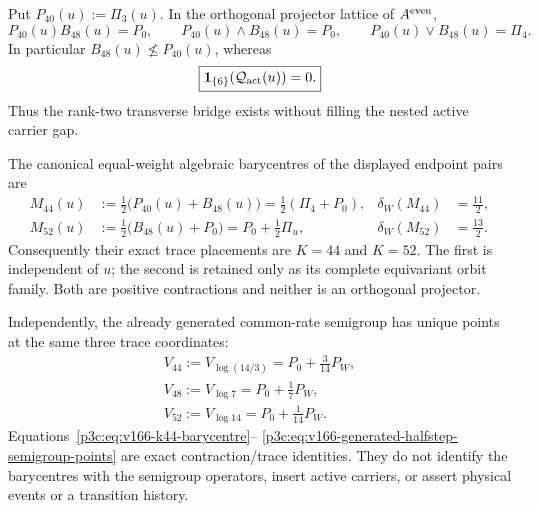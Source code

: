 \documentclass[12pt,a4paper]{article}
\begin{document}
\begin{theorem}
\label{p3c:thm:v166-transverse-diamond-halfsteps}
Put \(P_{40}(u):=\Pi_3(u)\).  In the orthogonal projector lattice of
\(A^{\rm even}\),
\begin{equation}
 \label{p3c:eq:v166-transverse-projector-diamond}
 \boxed{
 P_{40}(u)B_{48}(u)=P_0,
 \qquad
 P_{40}(u)\wedge B_{48}(u)=P_0,
 \qquad
 P_{40}(u)\vee B_{48}(u)=\Pi_4.}
\end{equation}
In particular \(B_{48}(u)\not\le P_{40}(u)\), whereas
\begin{equation}
 \label{p3c:eq:v166-active-gap-preserved}
 \boxed{
 \mathbf1_{\{6\}}(\mathcal Q_{\rm act}(u))=0.}
\end{equation}
Thus the rank-two transverse bridge exists without filling the nested active
carrier gap.

The canonical equal-weight algebraic barycentres of the displayed endpoint
pairs are
\begin{align}
 \label{p3c:eq:v166-k44-barycentre}
 M_{44}(u)
 &:=\frac12\bigl(P_{40}(u)+B_{48}(u)\bigr)
   =\frac12(\Pi_4+P_0),
 &\delta_W(M_{44})&=\frac{11}{2},\\
 \label{p3c:eq:v166-k52-barycentre}
 M_{52}(u)
 &:=\frac12\bigl(B_{48}(u)+P_0\bigr)
   =P_0+\frac12\Pi_u,
 &\delta_W(M_{52})&=\frac{13}{2}.
\end{align}
Consequently their exact trace placements are \(K=44\) and \(K=52\).
The first is independent of \(u\); the second is retained only as its complete
equivariant orbit family.  Both are positive contractions and neither is an
orthogonal projector.

Independently, the already generated common-rate semigroup has unique points
at the same three trace coordinates:
\begin{equation}
 \label{p3c:eq:v166-generated-halfstep-semigroup-points}
 \boxed{\begin{gathered}
 V_{44}:=V_{\log(14/3)}=P_0+\frac{3}{14}P_W,\\
 V_{48}:=V_{\log7}=P_0+\frac17P_W,\\
 V_{52}:=V_{\log14}=P_0+\frac1{14}P_W.
 \end{gathered}}
\end{equation}
Equations~\eqref{p3c:eq:v166-k44-barycentre}--
\eqref{p3c:eq:v166-generated-halfstep-semigroup-points} are exact
contraction/trace identities.  They do not identify the barycentres with the
semigroup operators, insert active carriers, or assert physical events or a
transition history.
\end{theorem}
\end{document}
